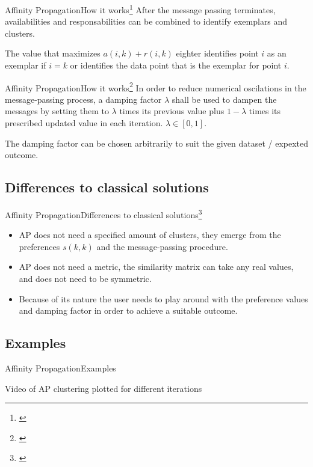 \documentclass{beamer}
\begin{document}
\begin{frame}{Affinity Propagation}{How it works\footnote{\cite{frey2007clustering}}}
	After the message passing terminates, \alert{availabilities} and \alert{responsabilities} can be combined to identify exemplars and clusters.
	
	The value that maximizes $a(i,k) + r(i,k)$ eighter identifies point $i$ as an exemplar if $i=k$ or identifies the data point that is the exemplar for point $i$.
\end{frame}
\begin{frame}{Affinity Propagation}{How it works\footnote{\cite{frey2007clustering}}}
	In order to reduce numerical oscilations in the message-passing process, a damping factor $\lambda$ shall be used to dampen the messages by setting them to $\lambda$ times its previous value plus $1-\lambda$ times its prescribed updated value in each iteration. $\lambda \in [0,1]$.
	
	The damping factor can be chosen arbitrarily to suit the given dataset / expexted outcome.
\end{frame}

\subsection{Differences to classical solutions}
\begin{frame}{Affinity Propagation}{Differences to classical solutions\footnote{\cite{frey2007clustering}}}
	\begin{itemize}
		\item AP does not need a specified amount of clusters, they emerge from the preferences $s(k,k)$ and the message-passing procedure.
		\item AP does not need a metric, the similarity matrix can take any real values, and does not need to be symmetric.
		\item Because of its nature the user needs to play around with the preference values and damping factor in order to achieve a suitable outcome.
	\end{itemize}
\end{frame}

\subsection{Examples}
\begin{frame}{Affinity Propagation}{Examples}
	\begin{center}
		Video of AP clustering plotted for different iterations
	\end{center}
\end{frame}
\end{document}
